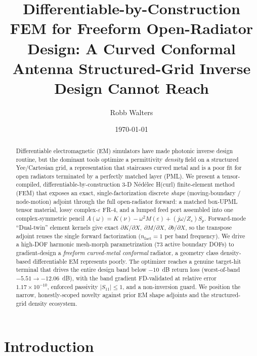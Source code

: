 \documentclass{anvil-paper}
\title{Differentiable-by-Construction FEM for Freeform Open-Radiator Design:
A Curved Conformal Antenna Structured-Grid Inverse Design Cannot Reach}
\author{Robb Walters}
\date{\today}
\begin{document}
\maketitle

\begin{abstract}
Differentiable electromagnetic (EM) simulators have made photonic inverse
design routine, but the dominant tools optimize a permittivity \emph{density}
field on a structured Yee/Cartesian grid, a representation that staircases
curved metal and is a poor fit for open radiators terminated by a perfectly
matched layer (PML). We present a tensor-compiled, differentiable-by-construction
3-D N\'ed\'elec H(curl) finite-element method (FEM) that exposes an exact,
single-factorization discrete \emph{shape} (moving-boundary / node-motion)
adjoint through the full open-radiator forward: a matched box-UPML tensor
material, lossy complex-$\varepsilon$ FR-4, and a lumped feed port assembled into
one complex-symmetric pencil $A(\omega)=K(\nu)-\omega^2 M(\varepsilon)+(j\omega/Z_s)S_p$.
Forward-mode ``Dual-twin'' element kernels give exact
$\partial K/\partial X,\ \partial M/\partial X,\ \partial b/\partial X$, so the
transpose adjoint reuses the single forward factorization
($n_{\text{fact}}=1$ per band frequency). We drive a high-DOF harmonic
mesh-morph parametrization (73 active boundary DOFs) to gradient-design a
\emph{freeform curved-metal conformal} radiator, a geometry class density-based
differentiable EM represents poorly. The optimizer reaches a genuine
target-hit terminal that drives the entire design band below $-10$~dB return
loss (worst-of-band $-5.51 \to -12.06$~dB), with the band gradient FD-validated
at relative error $1.17\times10^{-10}$, enforced passivity $|S_{11}|\le1$, and a
non-inversion guard. We position the narrow, honestly-scoped novelty against
prior EM shape adjoints and the structured-grid density ecosystem.
\end{abstract}

\section{Introduction}
\label{sec:intro}
\end{document}
